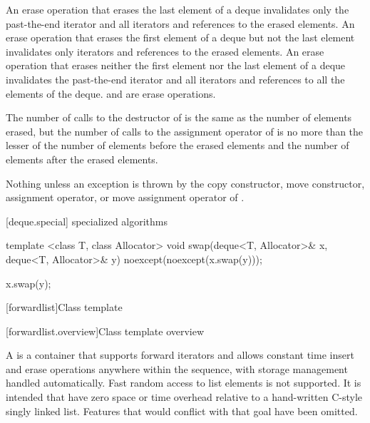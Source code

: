 \begin{itemdescr}
\pnum
\effects
An erase operation that erases the last element of a deque invalidates only the past-the-end iterator
and all iterators and references to the erased elements. An erase operation that erases the first
element of a deque but not the last element invalidates only iterators
and references to the erased elements. An erase operation
that erases neither the first element nor the last element of a deque invalidates the past-the-end
iterator and all iterators and references to all the elements of the deque.
\enternote {} and  are erase operations. \exitnote

\pnum
\complexity
The number of calls to the destructor of  is the same as the
number of elements erased, but the number of calls to the assignment operator of  is
no more than the lesser of the number of elements before the erased elements and the number of elements after the erased elements.

\pnum
\throws
Nothing unless an exception is thrown by the copy constructor, move constructor,
assignment operator, or move assignment operator of
.
\end{itemdescr}

[deque.special]{ specialized algorithms}

%
%
\begin{itemdecl}
template <class T, class Allocator>
  void swap(deque<T, Allocator>& x, deque<T, Allocator>& y)
    noexcept(noexcept(x.swap(y)));
\end{itemdecl}

\begin{itemdescr}
\pnum
\effects
\begin{codeblock}
x.swap(y);
\end{codeblock}
\end{itemdescr}

[forwardlist]{Class template }

[forwardlist.overview]{Class template  overview}

\pnum
A  is a container that supports forward iterators and allows
constant time insert and erase operations anywhere within the sequence, with storage
management handled automatically. Fast random access to list elements is not supported.
\enternote It is intended that  have zero space or time overhead
relative to a hand-written C-style singly linked list. Features that would conflict with
that goal have been omitted.\exitnote

